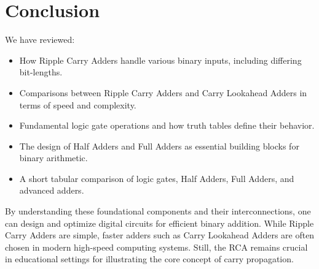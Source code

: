 \documentclass[12pt]{article}
\begin{document}
\section{Conclusion}
We have reviewed:
\begin{itemize}
  \item How Ripple Carry Adders handle various binary inputs, including differing bit-lengths.
  \item Comparisons between Ripple Carry Adders and Carry Lookahead Adders in terms of speed and complexity.
  \item Fundamental logic gate operations and how truth tables define their behavior.
  \item The design of Half Adders and Full Adders as essential building blocks for binary arithmetic.
  \item A short tabular comparison of logic gates, Half Adders, Full Adders, and advanced adders.
\end{itemize}

By understanding these foundational components and their interconnections, one can design and optimize digital circuits for efficient binary addition. While Ripple Carry Adders are simple, faster adders such as Carry Lookahead Adders are often chosen in modern high-speed computing systems. Still, the RCA remains crucial in educational settings for illustrating the core concept of carry propagation.
\end{document}
